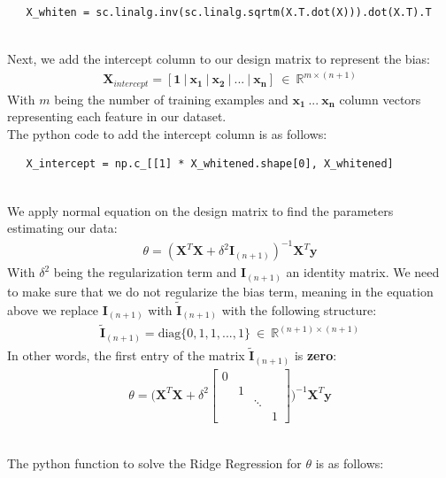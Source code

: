 \documentclass[a4paper,11pt]{article}
\begin{document}
\begin{verbatim}
   X_whiten = sc.linalg.inv(sc.linalg.sqrtm(X.T.dot(X))).dot(X.T).T
\end{verbatim}

\noindent
\\Next, we add the intercept column to our design matrix to represent the bias:
\begin{align*}
\mathbf{X}_{intercept} = [\mathbf{1}\ \vert\ \mathbf{x_1}\ \vert\ \mathbf{x_2}\ \vert\ ...\ \vert\ \mathbf{x_n}]\ \in \ \mathbb{R}^{m\times (n+1)}
\end{align*}
With $m$ being the number of training examples and $\mathbf{x_1}\ ...\ \mathbf{x_n}$ column vectors representing each feature in our dataset. 
\\The python code to add the intercept column is as follows:

\begin{verbatim}
   X_intercept = np.c_[[1] * X_whitened.shape[0], X_whitened]
\end{verbatim}

\noindent
\\We apply normal equation on the design matrix to find the parameters estimating our data:
\begin{align*}
\theta = (\mathbf{X}^T\mathbf{X}+\delta^2\mathbf{I}_{(n+1)})^{-1}\mathbf{X}^T\mathbf{y}
\end{align*}
With $\delta^2$ being the regularization term and $\mathbf{I}_{(n+1)}$ an identity matrix. We need to make sure that we do not regularize the bias term, meaning in the equation above we replace $\mathbf{I}_{(n+1)}$ with $\mathbf{\tilde{I}}_{(n+1)}$ with the following structure:
\begin{align*}
\mathbf{\tilde{I}}_{(n+1)} = \mathrm{diag}\big\{0, 1, 1, ..., 1\big\}\ \in\ \mathbb{R}^{(n+1)\times(n+1)}
\end{align*}
In other words, the first entry of the matrix $\mathbf{\tilde{I}}_{(n+1)}$ is \textbf{zero}:
\begin{align*}
\theta = \Biggl(\mathbf{X}^T\mathbf{X} + \delta^2 \begin{bmatrix}
0 & & & \\
& 1 & & \\
& & \ddots & \\
& & & 1
\end{bmatrix}\Biggl)^{-1}\mathbf{X}^T\mathbf{y}
\end{align*}

\noindent
\\The python function to solve the Ridge Regression for $\theta$ is as follows:
\end{document}
